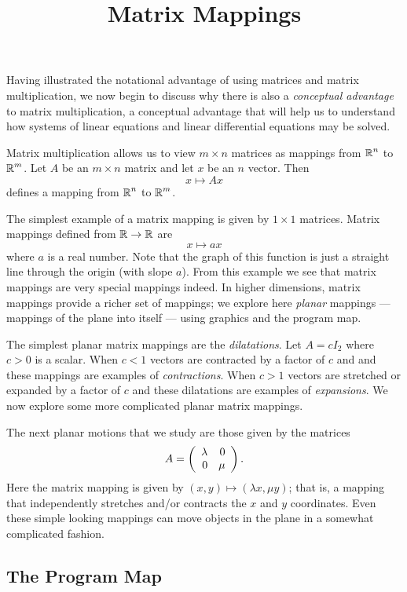 \documentclass{ximera}
\title{Matrix Mappings}
\begin{document}
\begin{abstract}
\end{abstract}
\maketitle

   \label{s:4.2}

Having illustrated the notational advantage of using matrices
and matrix multiplication, we now begin to discuss why there
is also a {\em conceptual advantage\/} to matrix
multiplication, a conceptual advantage that will help
us to understand how systems of linear equations and linear
differential equations may be solved.

Matrix multiplication allows us to view $m\times n$ matrices as
mappings from $\mbox{$\Bbb{R}$}^n$ to $\mbox{$\Bbb{R}$}^m$.  Let $A$ be an $m\times n$
matrix and let $x$ be an $n$ vector.  Then
\[
x \mapsto Ax
\]
defines a mapping from $\mbox{$\Bbb{R}$}^n$ to $\mbox{$\Bbb{R}$}^m$.

The simplest example of a matrix mapping is given by $1\times 1$
matrices.  Matrix mappings defined from $\mbox{$\Bbb{R}$}\to\mbox{$\Bbb{R}$}$ are
\[
x \mapsto ax
\]
where $a$ is a real number.  Note that the graph of this
function is just a straight line through the origin (with slope
$a$).  From this example we see that matrix mappings are very
special mappings indeed. In higher dimensions, matrix mappings
provide a richer set of mappings; we explore here {\em planar\/}
mappings --- mappings of the plane into
itself --- using \Matlab graphics and the program {\sf map}.

The simplest planar matrix mappings are the
{\em dilatations\/}.
Let $A=cI_2$ where $c>0$ is a scalar.  When $c<1$ vectors are
contracted by a factor of $c$ and and these mappings are
examples of {\em contractions}.
When $c>1$ vectors are
stretched or expanded by a factor of $c$ and these dilatations
are examples of {\em expansions}.
We now explore some more complicated planar matrix mappings.

The next planar motions that we study are those given by the
matrices
\[
A=\left(\begin{array}{rr} \lambda & 0\\ 0 &\mu\end{array}\right).
\]
Here the matrix mapping is given by $(x,y)\mapsto(\lambda x,\mu y)$;
that is, a mapping that independently stretches and/or contracts the
$x$ and $y$ coordinates.  Even these simple looking mappings can move 
objects in the plane in a somewhat complicated fashion.

\subsection*{The Program Map}  
\end{document}
